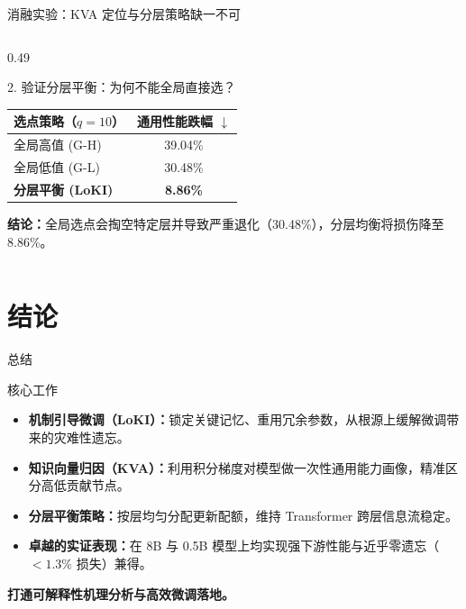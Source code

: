 \documentclass{beamer}
\begin{document}
\begin{frame}{消融实验：KVA 定位与分层策略缺一不可}
\begin{columns}[T]
\begin{column}{0.49\textwidth}
\begin{block}{2. 验证分层平衡：为何不能全局直接选？}
                    \centering
                    \small
                    \begin{tabular}{l|c}
                        \toprule
                        \textbf{选点策略（$q=10$）} & \textbf{通用性能跌幅 $\downarrow$} \\
                        \midrule
                        全局高值 (G-H) & 39.04\% \\
                        全局低值 (G-L) & 30.48\% \\
                        \midrule
                        \textbf{分层平衡 (LoKI)} & \textcolor{green!60!black}{\textbf{8.86\%}} \\
                        \bottomrule
                    \end{tabular}
                \end{block}
                \vspace{0.1cm}
                \footnotesize \textbf{结论：}全局选点会掏空特定层并导致严重退化（30.48\%），分层均衡将损伤降至 8.86\%。
            \end{column}
        \end{columns}
    \end{frame}
    
    \section{结论}
    \begin{frame}{总结}
        \begin{block}{核心工作}
            \begin{itemize}\setlength{\itemsep}{0.4em}
                \item \textbf{机制引导微调（LoKI）：}锁定关键记忆、重用冗余参数，从根源上缓解微调带来的灾难性遗忘。
                \item \textbf{知识向量归因（KVA）：}利用积分梯度对模型做一次性通用能力画像，精准区分高低贡献节点。
                \item \textbf{分层平衡策略：}按层均匀分配更新配额，维持 Transformer 跨层信息流稳定。
                \item \textbf{卓越的实证表现：}在 8B 与 0.5B 模型上均实现强下游性能与近乎零遗忘（$<1.3\%$ 损失）兼得。
            \end{itemize}
        \end{block}

        \vspace{0.3cm}
        \begin{center}
            \alert{\textbf{打通可解释性机理分析与高效微调落地。}}
        \end{center}
    \end{frame}
    
\end{document}
